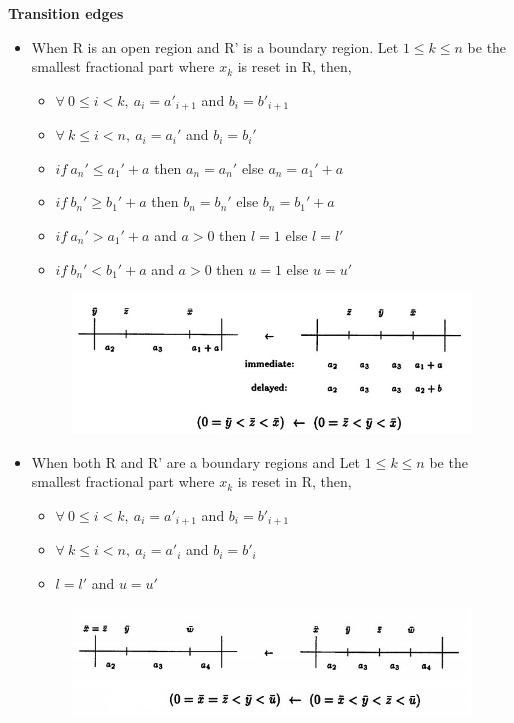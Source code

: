 \documentclass[a4paper,UKenglish,cleveref, autoref, thm-restate]{lipics-v2019}
\begin{document}
\textbf{Transition edges} 
\begin{itemize}
\item When R is an open region and R' is a boundary region. Let $1\leq k \leq n$ be the smallest fractional part where $x_k$ is reset in R, then,
\begin{itemize}
\item $\forall\ 0 \leq i < k,\ a_i = a'_{i+1}$ and $b_i = b'_{i+1}$
\item $\forall\ k \leq i < n,\ a_i = a_i'$ and $b_i = b_i'$
\item $if\ a_n' \leq a_1' + a$ then $a_n=a_n'$ else $a_n = a_1' + a$
\item $if\ b_n' \geq b_1' + a$ then $b_n=b_n'$ else $b_n = b_1' + a$
\item $if\ a_n' > a_1' + a$ and $a>0$ then $l=1$ else $l=l'$
\item $if\ b_n' < b_1' + a$ and $a>0$ then $u=1$ else $u=u'$
\end{itemize}
\begin{figure}[h]
\centering
\includegraphics[scale=.4]{1b}
\end{figure}
\end{itemize} 

\begin{itemize}
\item When both R and R' are a boundary regions and Let $1\leq k \leq n$ be the smallest fractional part where $x_k$ is reset in R, then,
\begin{itemize}
\item $\forall\ 0 \leq i < k,\ a_i = a'_{i+1}$ and $b_i = b'_{i+1}$
\item $\forall\ k \leq i < n,\ a_i = a'_{i}$ and $b_i = b'_{i}$
\item $l=l'$ and $u=u'$
\end{itemize}
\begin{figure}[h]
\centering
\includegraphics[scale=.4]{3}
\end{figure}
\end{itemize}
\end{document}
